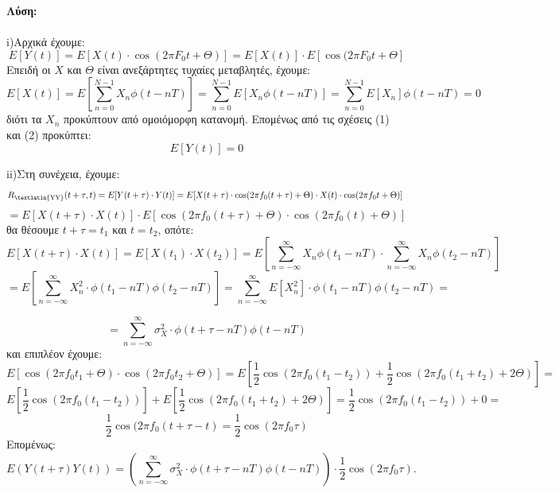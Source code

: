     \begin{justify}
        {\bf Λύση:}\\\\
        \textlatin{i)}Αρχικά έχουμε:
        \[
        E[Y (t)] = E[X(t)\cdot \cos(2\pi F_0 t + \Theta)] = E[X(t)]\cdot
        E[\cos(2\pi F_0 t + \Theta] \tag{1}   
        \] 
         Επειδή οι \( X \) και \( \Theta \) είναι ανεξάρτητες 
         τυχαίες μεταβλητές, έχουμε:
         \[
            E[X(t)] = E[\sum_{n=0}^{N-1}X_n\phi(t-nT)] = 
            \sum_{n=0}^{N-1}E[X_n\phi(t-nT)] = \sum_{n=0}^{N-1}E[X_n]
            \phi(t-nT) = 0 \tag{2}
         \]
         διότι τα $X_n$ προκύπτουν από ομοιόμορφη κατανομή. 
         Επομένως από τις σχέσεις (1) και (2) προκύπτει:
         \[
            E[Y(t)] = 0 
         \]
    \end{justify}

    \begin{justify}
        \textlatin{ii)}Στη συνέχεια, έχουμε:
        \[
        R\textsubscript{\textlatin{YY}}(t+\tau, t) = E[Y(t+\tau)\cdot Y(t)] = E[X(t+\tau)
        \cdot\cos(2\pi f_0(t+\tau) + \Theta)\cdot X(t)
        \cdot\cos(2\pi f_0 t + \Theta)] \
        \]
        \[
           = E[X(t+\tau)\cdot X(t)]\cdot E[\cos(2\pi f_0(t+\tau) + \Theta) 
           \cdot \cos(2\pi f_0(t) + \Theta) ]
        \]
        θα θέσουμε $t+\tau=t_1$ και $t=t_2$, οπότε:
        \[
            E[X(t+\tau)\cdot X(t)] = E[X(t_1)\cdot X(t_2)] =
            Ε[\sum_{n=-\infty}^{\infty}X_n\phi(t_1-nT)\cdot
            \sum_{n=-\infty}^{\infty}X_n\phi(t_2-nT)]
        \]
        \[
            = E[\sum_{n=-\infty}^{\infty}X_n^2\cdot \phi(t_1-nT) \phi(t_2-nT)] 
            = \sum_{n=-\infty}^{\infty}E[X_n^2]\cdot \phi(t_1-nT)\phi(t_2-nT) =
            \]
\end{justify}

\newpage

\begin{justify}
    \[
        = \sum_{n=-\infty}^{\infty} \sigma_X^2 \cdot \phi(t+\tau-nT)\phi(t-nT)     
    \]
    και επιπλέον έχουμε:
    \[
        Ε[\cos(2\pi f_0 t_1 + \Theta) \cdot \cos(2\pi f_0 t_2 + \Theta)] =
        E[\frac{1}{2}\cos(2\pi f_0(t_1-t_2)) + 
        \frac{1}{2}\cos(2\pi f_0(t_1+t_2) + 2\Theta)]=
    \]
    \[
        E[\frac{1}{2}\cos(2\pi f_0(t_1-t_2))] +
        E[\frac{1}{2}\cos(2\pi f_0(t_1+t_2) + 2\Theta)]=   
        \frac{1}{2}\cos(2\pi f_0(t_1-t_2)) + 0 = 
    \]
    \[
        \frac{1}{2}\cos(2\pi f_0(t+\tau-t) = \frac{1}{2}\cos(2\pi f_0\tau)  
    \]
    Επομένως:
    \[
        E(Y(t+\tau)Y(t)) = \left ( \sum_{n=-\infty}^{\infty} \sigma_X^2 \cdot \phi(t+\tau-nT)\phi(t-nT)  \right )
        \cdot \frac{1}{2}\cos(2\pi f_0\tau).
    \]
\end{justify}

